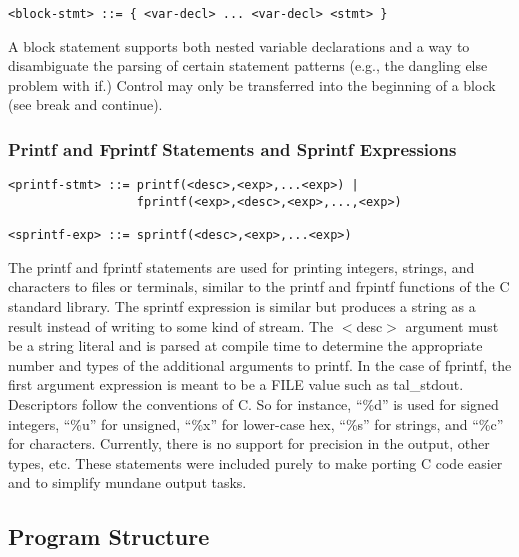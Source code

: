 \documentclass[titlepage,10pt]{article}
\begin{document}
\begin{verbatim}
<block-stmt> ::= { <var-decl> ... <var-decl> <stmt> }
\end{verbatim}

A block statement supports both nested variable declarations and a way
to disambiguate the parsing of certain statement patterns (e.g., the
dangling else problem with if.)   Control may only be transferred into
the beginning of a block (see break and continue).


\subsubsection{Printf and Fprintf Statements and Sprintf Expressions}


\begin{verbatim}
<printf-stmt> ::= printf(<desc>,<exp>,...<exp>) | 
                  fprintf(<exp>,<desc>,<exp>,...,<exp>)

<sprintf-exp> ::= sprintf(<desc>,<exp>,...<exp>)
\end{verbatim}

The printf and fprintf statements are used for printing integers,
strings, and characters to files or terminals, similar to the printf and
frpintf functions of the C standard library.  The sprintf expression is
similar but produces a string as a result instead of writing to some
kind of stream.  The $<$desc$>$ argument must be a string literal and is
parsed at compile time to determine the appropriate number and types of
the additional arguments to printf.   In the case of fprintf, the first
argument expression is meant to be a FILE value such as tal{\_}stdout.
Descriptors follow the conventions of C.  So for instance, ``\%d'' is
used for signed integers, ``\%u'' for unsigned, ``\%x'' for lower-case
hex, ``\%s'' for strings, and ``\%c'' for characters. Currently, there
is no support for precision in the output, other types, etc.   These
statements were included purely to make porting C code easier and to
simplify mundane output tasks.


\subsection{Program Structure\label{programs}}
\end{document}
